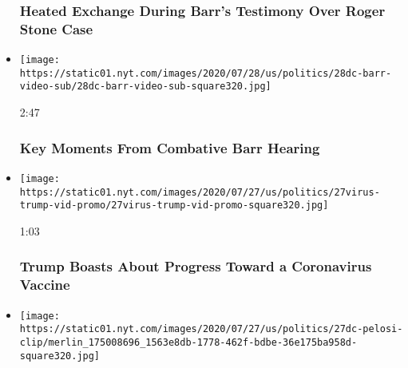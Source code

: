 \begin{itemize}
  \hypertarget{heated-exchange-during-barrs-testimony-over-roger-stone-case}{%
  \subsubsection{Heated Exchange During Barr's Testimony Over Roger
  Stone
  Case}\label{heated-exchange-during-barrs-testimony-over-roger-stone-case}}
\item
  \href{https://www.nytimes.com/video/us/politics/100000007260259/barr-testifies-house-judiciary.html?action=click\&module=video-series-bar\&region=header\&pgtype=Article\&playlistId=video/us-politics}{}

  \texttt{[image: https://static01.nyt.com/images/2020/07/28/us/politics/28dc-barr-video-sub/28dc-barr-video-sub-square320.jpg]}

  2:47

  \hypertarget{key-moments-from-combative-barr-hearing}{%
  \subsubsection{Key Moments From Combative Barr
  Hearing}\label{key-moments-from-combative-barr-hearing}}
\item
  \href{https://www.nytimes.com/video/us/100000007258794/trump-boasts-vaccine-progress-north-carolina.html?action=click\&module=video-series-bar\&region=header\&pgtype=Article\&playlistId=video/us-politics}{}

  \texttt{[image: https://static01.nyt.com/images/2020/07/27/us/politics/27virus-trump-vid-promo/27virus-trump-vid-promo-square320.jpg]}

  1:03

  \hypertarget{trump-boasts-about-progress-toward-a-coronavirus-vaccine}{%
  \subsubsection{Trump Boasts About Progress Toward a Coronavirus
  Vaccine}\label{trump-boasts-about-progress-toward-a-coronavirus-vaccine}}
\item
  \href{https://www.nytimes.com/video/us/100000007259050/john-lewis-memorial-pelosi.html?action=click\&module=video-series-bar\&region=header\&pgtype=Article\&playlistId=video/us-politics}{}

  \texttt{[image: https://static01.nyt.com/images/2020/07/27/us/politics/27dc-pelosi-clip/merlin\_175008696\_1563e8db-1778-462f-bdbe-36e175ba958d-square320.jpg]}


\end{itemize}
